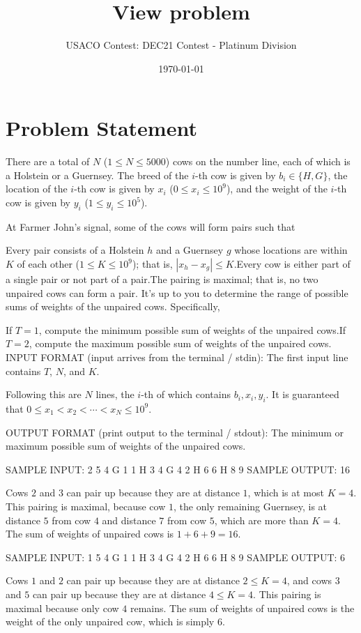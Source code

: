 \documentclass[12pt]{article}
\title{View problem}
\author{USACO Contest: DEC21 Contest - Platinum Division}
\date{\today}
\begin{document}
\maketitle

\section*{Problem Statement}

There are a total of $N$ ($1\le N\le 5000$) cows on the number line, each of
which is a  Holstein or a Guernsey. The breed of the $i$-th cow is given by
$b_i\in \{H,G\}$, the location of the $i$-th cow is given by $x_i$
($0 \leq x_i \leq 10^9$), and the weight of the  $i$-th cow is given by
$y_i$ ($1 \leq y_i \leq 10^5$).

At Farmer John's signal, some of the cows will form pairs such that 

Every pair consists of a Holstein $h$ and a Guernsey $g$ whose locations are
within $K$ of each other ($1\le K\le 10^9$); that is, $|x_h-x_g|\le K$.Every cow is either part of a single pair or not part of a pair.The pairing is maximal; that is, no two unpaired cows can form a
pair.
It's up to you to determine the range of possible sums of weights of the
unpaired cows. Specifically,

If $T=1$, compute the minimum possible sum of weights of the unpaired
cows.If $T=2$, compute the maximum possible sum of weights of the
unpaired cows.
INPUT FORMAT (input arrives from the terminal / stdin):
The first input line contains $T$, $N$, and $K$.

Following this are $N$ lines, the $i$-th of which contains $b_i,x_i,y_i$. It is
guaranteed that $0\le x_1< x_2< \cdots< x_N\le 10^9$.

OUTPUT FORMAT (print output to the terminal / stdout):
The minimum or maximum possible sum of weights of the unpaired cows.

SAMPLE INPUT:
2 5 4
G 1 1
H 3 4
G 4 2
H 6 6
H 8 9
SAMPLE OUTPUT: 
16

Cows $2$ and $3$ can pair up because they are at distance $1$, which is at most
$K = 4$. This pairing is maximal, because cow $1$, the only remaining Guernsey,
is at distance $5$ from cow $4$ and distance $7$ from cow $5$, which are more
than $K = 4$. The sum of weights of unpaired cows is
$1 + 6 + 9 = 16$.

SAMPLE INPUT:
1 5 4
G 1 1
H 3 4
G 4 2
H 6 6
H 8 9
SAMPLE OUTPUT: 
6

Cows $1$ and $2$ can pair up because they are at distance $2 \leq K = 4$, and
cows $3$ and $5$ can pair up because they are at distance $4 \leq K = 4$. This
pairing is maximal because only cow $4$ remains. The sum of weights of
unpaired cows is the weight of the only unpaired cow, which is simply $6$.
\end{document}

